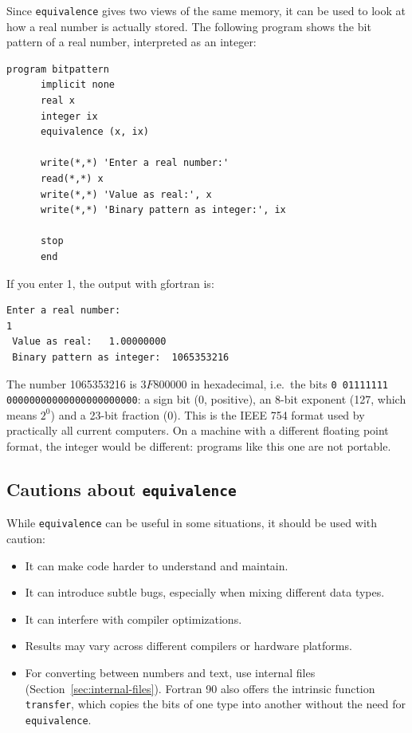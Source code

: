 Since \texttt{equivalence} gives two views of the same memory, it can be used to look at how a real number is actually stored. The following program shows the bit pattern of a real number, interpreted as an integer:

\begin{lstlisting}[style=fortran77]
      program bitpattern
      implicit none
      real x
      integer ix
      equivalence (x, ix)

      write(*,*) 'Enter a real number:'
      read(*,*) x
      write(*,*) 'Value as real:', x
      write(*,*) 'Binary pattern as integer:', ix

      stop
      end
\end{lstlisting}

If you enter 1, the output with gfortran is:

\begin{lstlisting}[style=output]
 Enter a real number:
1
 Value as real:   1.00000000
 Binary pattern as integer:  1065353216
\end{lstlisting}

The number 1065353216 is $3F800000$ in hexadecimal, i.e.\ the bits \texttt{0 01111111 00000000000000000000000}: a sign bit (0, positive), an 8-bit exponent (127, which means $2^0$) and a 23-bit fraction (0). This is the IEEE 754 format used by practically all current computers. On a machine with a different floating point format, the integer would be different: programs like this one are not portable.

\subsection{Cautions about \texttt{equivalence}}

While \texttt{equivalence} can be useful in some situations, it should be used with caution:

\begin{itemize}
    \item It can make code harder to understand and maintain.
    \item It can introduce subtle bugs, especially when mixing different data types.
    \item It can interfere with compiler optimizations.
    \item Results may vary across different compilers or hardware platforms.
    \item For converting between numbers and text, use internal files (Section~\ref{sec:internal-files}). Fortran 90 also offers the intrinsic function \texttt{transfer}, which copies the bits of one type into another without the need for \texttt{equivalence}.
\end{itemize}

